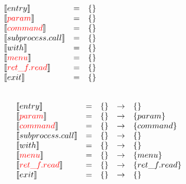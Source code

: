 \newcommand{\constraint}[1]{
\llbracket #1 \rrbracket
  }

\newcommand{\assignconstraint}[1]{
\llbracket {\color{red}#1} \rrbracket
  }




\begin{frame}
\[
\begin{array}{lclcl}
  \constraint{entry} & = & \{\} &\phantom{hahahahhh}\\
  \assignconstraint{param} & = & \{\} &\\
  \assignconstraint{command} & = & \{\}&\\
  \constraint{subprocess.call} & = & \{\}&\\
  \constraint{with} & = & \{\}&\\
  \assignconstraint{menu} & = & \{\}&\\
  \assignconstraint{ret\_f.read} & = & \{\}&\\
  \constraint{exit} & = & \{\}&\\
  && \phantom{\{command, param\}} && \phantom{\{command, param\}}
\end{array}
\]
\end{frame}

\begin{frame}
\[
\begin{array}{lclcl}
  \constraint{entry} & = & \{\} & \rightarrow & \{\}\\
  \assignconstraint{param} & = & \{\} & \rightarrow &\{param\}\\
  \assignconstraint{command} & = & \{\}& \rightarrow &\{command\}\\
  \constraint{subprocess.call} & = & \{\}& \rightarrow &\{\}\\
  \constraint{with} & = & \{\}&\rightarrow & \{\}\\
  \assignconstraint{menu} & = & \{\}& \rightarrow & \{menu\}\\
  \assignconstraint{ret\_f.read} & = & \{\}&\rightarrow & \{ret\_f.read\}\\
  \constraint{exit} & = & \{\}&\rightarrow & \{\}\\
  && && \phantom{\{command, param\}\{command, param\}}
\end{array}
\]
\end{frame}

